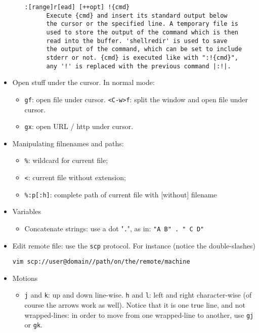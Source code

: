 \documentclass[a4paper,12pt,%
              final%
              ]{article}
\begin{document}
\begin{itemize}
\begin{itemize}
\begin{verbatim}
:[range]r[ead] [++opt] !{cmd}
      Execute {cmd} and insert its standard output below
      the cursor or the specified line. A temporary file is
      used to store the output of the command which is then
      read into the buffer. 'shellredir' is used to save
      the output of the command, which can be set to include
      stderr or not. {cmd} is executed like with ":!{cmd}",
      any '!' is replaced with the previous command |:!|.
\end{verbatim}
    \end{itemize}
  \item Open stuff under the cursor. In normal mode:
    \begin{itemize}
      \item \texttt{gf}: open file under cursor. \texttt{<C-w>f}: split the window
        and open file under cursor.
      \item \texttt{gx}: open URL / http under cursor.
    \end{itemize}
  \item Manipulating filnenames and paths:
    \begin{itemize}
      \item \verb|%|: wildcard for current file;
      \item \verb|<|: current file without extension;
      \item \verb|%:p[:h]|: complete path of current file with [without] filename
    \end{itemize}
  \item Variables
    \begin{itemize}
      \item Concatenate strings: use a dot "\texttt{.}", as in: \verb|"A B" . " C D"|
    \end{itemize}
  \item Edit remote file: use the \texttt{scp} protocol. For instance (notice the
    double-slashes)
\begin{verbatim}
vim scp://user@domain//path/on/the/remote/machine
\end{verbatim}
  \item Motions
    \begin{itemize}
      \item \texttt{j} and \texttt{k}: up and down line-wise. \texttt{h} and
        \texttt{l}: left and right character-wise (of course the arrows work as
        well). Notice that it is one true line, and not wrapped-lines: in order to
        move from one wrapped-line to another, use \texttt{gj} or \texttt{gk}.

\end{itemize}
\end{itemize}
\end{document}
